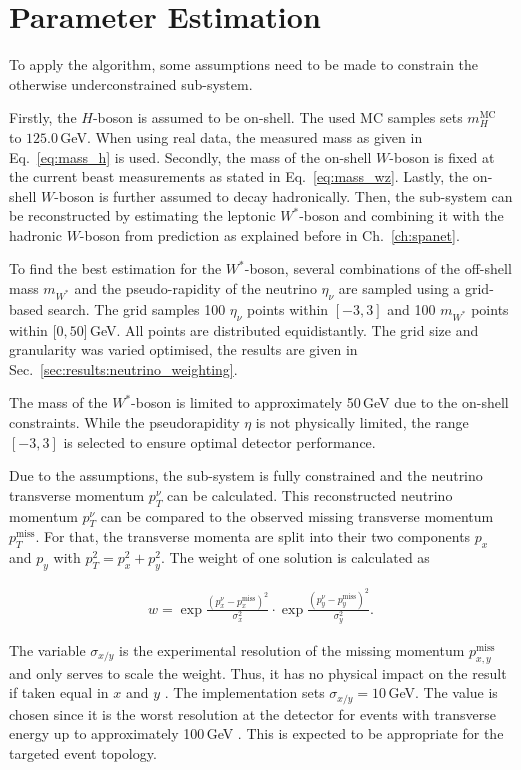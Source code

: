 \documentclass[bachelor,ngerman,english]{GAUBM}
\begin{document}
\section{Parameter Estimation}
To apply the \NW algorithm, some assumptions need to be made to constrain the otherwise underconstrained \HWW sub-system. 

Firstly, the $H$-boson is assumed to be on-shell. The used MC samples sets $m_H^\text{MC}$ to $125.0$\,GeV. When using real data, the measured mass as given in Eq.~\ref{eq:mass_h} is used. Secondly, the mass of the on-shell $W$-boson is fixed at the current beast measurements as stated in Eq.~\ref{eq:mass_wz}. Lastly, the on-shell $W$-boson is further assumed to decay hadronically. Then, the \HWW sub-system can be reconstructed by estimating the leptonic $W^*$-boson and combining it with the hadronic $W$-boson from \spanets prediction as explained before in Ch.~\ref{ch:spanet}.

To find the best estimation for the $W^*$-boson, several combinations of the off-shell mass $m_{W^*}$ and the pseudo-rapidity of the neutrino $\eta_\nu$ are sampled using a grid-based search. The grid samples 100 $\eta_\nu$ points within $[-3,3]$ and 100 $m_{W^*}$ points within [$0,50$]\,GeV. All points are distributed equidistantly. The grid size and granularity was varied optimised, the results are given in Sec.~\ref{sec:results:neutrino_weighting}. 

The mass of the $W^*$-boson is limited to approximately 50\,GeV due to the on-shell constraints. While the pseudorapidity $\eta$ is not physically limited, the range $[-3,3]$ is selected to ensure optimal detector performance. %

Due to the assumptions, the \HWW sub-system is fully constrained \cite{neutrino_weighting:adaptation} and the neutrino transverse momentum $p_T^\nu$ can be calculated. This reconstructed neutrino momentum $p_T^\nu$ can be compared to the observed missing transverse momentum $p_T^\text{miss}$. For that, the transverse momenta are split into their two components $p_x$ and $p_y$ with $p_T^2=p_x^2+p_y^2$. The weight of one solution is calculated as

\begin{align}
    w = \exp{\frac{(p_x^\nu-p_x^\text{miss})^2}{\sigma_x^2}} \cdot \exp{\frac{(p_y^\nu-p_y^\text{miss})^2}{\sigma_y^2}}.
\end{align}

The variable $\sigma_{x/y}$ is the experimental resolution of the missing momentum $p_{x,y}^\text{miss}$ and only serves to scale the weight. Thus, it has no physical impact on the result if taken equal in $x$ and $y$ \cite{neutrino_weighting:adaptation}. The implementation sets  $\sigma_{x/y}=10\,$GeV. The value is chosen since it is the worst resolution at the \atlas detector for events with transverse energy up to approximately 100\,GeV \cite{atlas:met_resolution}. This is expected to be appropriate for the targeted event topology.
\end{document}
